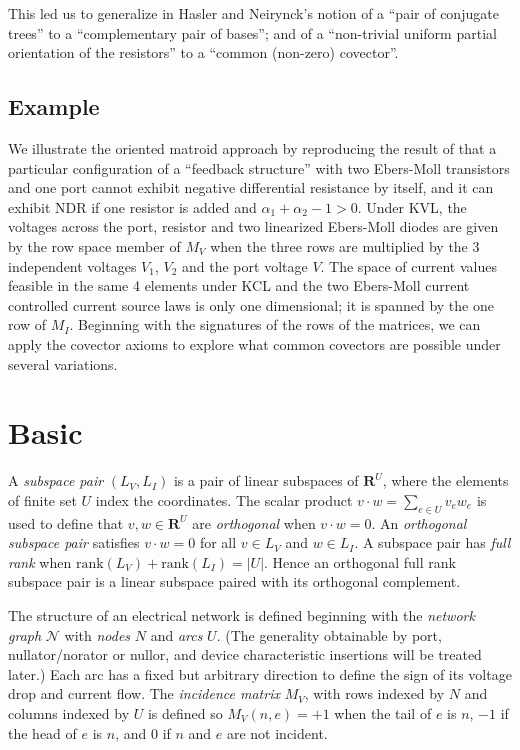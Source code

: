 \documentclass{article}
\def\Reals{\ensuremath{\mathbf R}}
\begin{document}
This led us to generalize in \cite{sdcOMP}
Hasler and Neirynck's notion of a ``pair of 
conjugate trees'' to a ``complementary pair of bases''; and of 
a ``non-trivial uniform partial orientation of the resistors''
to a ``common (non-zero) covector''.   

\subsection{Example}

We illustrate the oriented matroid approach by reproducing the result of
\cite{TrajWillNDR} that a particular configuration of a ``feedback structure''
with two Ebers-Moll transistors and one port
cannot exhibit negative differential resistance by itself, and it can 
exhibit NDR if one resistor is added and $\alpha_1+\alpha_2-1>0$.  
Under KVL,
the voltages across the port, resistor
and two linearized 
Ebers-Moll diodes are given by the row space member of $M_V$ when the
three rows are multiplied by the 3 independent voltages
$V_1$, $V_2$ and the port voltage $V$.  The space of current values
feasible in the same 4 elements under KCL and the two Ebers-Moll current 
controlled current source laws is only one dimensional; it is spanned by the one
row of $M_I$.  Beginning with the signatures of the rows of the matrices,
we can apply the covector axioms to explore what common covectors are possible
under several variations.




\section{Basic}
\label{sec:Basic}

A \textit{subspace pair} $(L_V, L_I)$ is a pair of linear subspaces of
$\Reals^U$, where the elements of finite set $U$ index the coordinates.
The scalar product $v\cdot w = \sum_{e\in U}v_e w_e$ is used to define that
$v, w \in \Reals^U$ are \textit{orthogonal} when $v\cdot w = 0$.  An 
\textit{orthogonal subspace pair}  satisfies $v\cdot w = 0$ for
all $v\in L_V$ and $w\in L_I$.  A subspace pair has \textit{full rank} when
$\mathrm{rank}(L_V)+\mathrm{rank}(L_I)= |U|$.  Hence an orthogonal full rank 
subspace pair is a linear subspace paired with its orthogonal complement.

The structure of an electrical network is defined 
beginning with the \textit{network graph}
$\mathcal{N}$ with \textit{nodes} $N$  and \textit{arcs} $U$.  
(The generality obtainable by port, nullator/norator or nullor, and 
device characteristic insertions will be treated later.)
Each arc has 
a fixed but arbitrary direction to define the sign of its voltage drop and
current flow.  The \textit{incidence matrix} $M_V$, with rows indexed by $N$
and columns indexed by $U$ is defined so $M_V(n,e)=+1$ when the tail of $e$ is
$n$, $-1$ if the head of $e$ is $n$, and $0$ if $n$ and $e$ are not incident.
\end{document}
